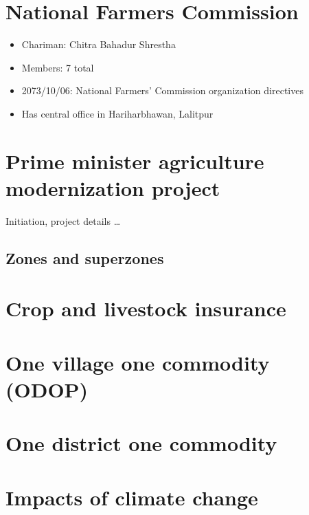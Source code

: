 \documentclass[
]{book}
\providecommand{\tightlist}{%
  \setlength{\itemsep}{0pt}\setlength{\parskip}{0pt}}
\begin{document}
\hypertarget{national-farmers-commission}{%
\section{National Farmers Commission}\label{national-farmers-commission}}

\begin{itemize}
\tightlist
\item
  Chariman: Chitra Bahadur Shrestha
\item
  Members: 7 total
\item
  2073/10/06: National Farmers' Commission organization directives
\item
  Has central office in Hariharbhawan, Lalitpur
\end{itemize}

\hypertarget{prime-minister-agriculture-modernization-project}{%
\section{Prime minister agriculture modernization project}\label{prime-minister-agriculture-modernization-project}}

Initiation, project details \ldots{}

\hypertarget{zones-and-superzones}{%
\subsection{Zones and superzones}\label{zones-and-superzones}}

\hypertarget{crop-and-livestock-insurance}{%
\section{Crop and livestock insurance}\label{crop-and-livestock-insurance}}

\hypertarget{one-village-one-commodity-odop}{%
\section{One village one commodity (ODOP)}\label{one-village-one-commodity-odop}}

\hypertarget{one-district-one-commodity}{%
\section{One district one commodity}\label{one-district-one-commodity}}

\hypertarget{impacts-of-climate-change}{%
\section{Impacts of climate change}\label{impacts-of-climate-change}}
\end{document}
